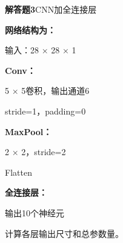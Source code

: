 \documentclass[UTF8,openany,oneside,zihao=-4,fontset=windows]{ctexbook}
\newif\ifshowsolutions
\newcommand{\Question}[2]{%
  \par\Needspace{4\baselineskip}\medskip
  \noindent\textbf{\color{MVBlue}#1}\quad #2\par
}
\newenvironment{AnswerBox}{\begin{tcolorbox}[breakable,colback=MVLight,colframe=MVBlue!45,title={参考答案},fonttitle=\bfseries,boxrule=0.55pt,arc=1.5mm,left=2mm,right=2mm,top=1.5mm,bottom=1.5mm]}{\end{tcolorbox}}
\newcommand{\PracticeSpace}[1]{\ifshowsolutions\else\par\vspace{#1}\par\fi}
\begin{document}
\ifshowsolutions
\begin{AnswerBox}
\par Conv1
\par\noindent\textbf{输出尺寸：}
\begin{center}\small\ttfamily H\_out = (64 + 2 - 3)/1 + 1 = 64\end{center}
\par\noindent\textbf{所以：}
\par 64×64×16
\par\noindent\textbf{参数量：}
\begin{center}\small\ttfamily (3×3×3+1)×16 = 28×16 = 448\end{center}
\par MaxPool
\par\noindent\textbf{空间尺寸减半，通道数不变：}
\par 32×32×16
\par Conv2
\par\noindent\textbf{输出空间尺寸：}
\begin{center}\small\ttfamily H\_out = (32 - 5)/1 + 1 = 28\end{center}
\par\noindent\textbf{所以：}
\par 28×28×32
\par\noindent\textbf{参数量：}
\begin{center}\small\ttfamily (5×5×16+1)×32 =401×32=12832\end{center}
\par\noindent\textbf{因此：}
\par Conv2参数量=12832
\end{AnswerBox}
\else
\PracticeSpace{4.2cm}
\fi
\Question{解答题3}{CNN加全连接层}
\par\noindent\textbf{网络结构为：}
\par 输入：28 × 28 × 1
\par\noindent\textbf{Conv：}
\par 5 × 5卷积，输出通道6
\par stride=1，padding=0
\par\noindent\textbf{MaxPool：}
\par 2 × 2，stride=2
\par Flatten
\par\noindent\textbf{全连接层：}
\par 输出10个神经元
\par 计算各层输出尺寸和总参数量。
\ifshowsolutions
\end{document}
